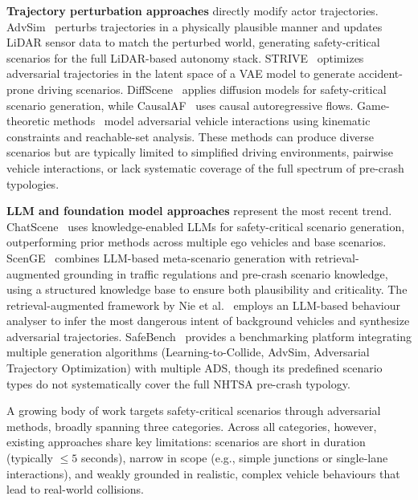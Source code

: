 \textbf{Trajectory perturbation approaches} directly modify actor trajectories. AdvSim~\cite{wang_advsim_2023} perturbs trajectories in a physically plausible manner and updates LiDAR sensor data to match the perturbed world, generating safety-critical scenarios for the full LiDAR-based autonomy stack. STRIVE~\cite{rempe_generating_2022} optimizes adversarial trajectories in the latent space of a VAE model to generate accident-prone driving scenarios. DiffScene~\cite{xu_diffscene_2025} applies diffusion models for safety-critical scenario generation, while CausalAF~\cite{ding_causalaf_2023} uses causal autoregressive flows. Game-theoretic methods~\cite{lin_scenario-based_2025} model adversarial vehicle interactions using kinematic constraints and reachable-set analysis. These methods can produce diverse scenarios but are typically limited to simplified driving environments, pairwise vehicle interactions, or lack systematic coverage of the full spectrum of pre-crash typologies.

\textbf{LLM and foundation model approaches} represent the most recent trend. ChatScene~\cite{zhang_chatscene_2024} uses knowledge-enabled LLMs for safety-critical scenario generation, outperforming prior methods across multiple ego vehicles and base scenarios. ScenGE~\cite{liu_adversarial_2025} combines LLM-based meta-scenario generation with retrieval-augmented grounding in traffic regulations and pre-crash scenario knowledge, using a structured knowledge base to ensure both plausibility and criticality. The retrieval-augmented framework by Nie et al.~\cite{mei_seeking_2025} employs an LLM-based behaviour analyser to infer the most dangerous intent of background vehicles and synthesize adversarial trajectories. SafeBench~\cite{xu_safebench_2022} provides a benchmarking platform integrating multiple generation algorithms (Learning-to-Collide, AdvSim, Adversarial Trajectory Optimization) with multiple ADS, though its predefined scenario types do not systematically cover the full NHTSA pre-crash typology.



\fi

A growing body of work targets safety-critical scenarios through adversarial methods, broadly spanning three categories. Across all categories, however, existing approaches share key limitations: scenarios are short in duration (typically $\leq5$ seconds), narrow in scope (e.g., simple junctions or single-lane interactions), and weakly grounded in realistic, complex vehicle behaviours that lead to real-world collisions.

